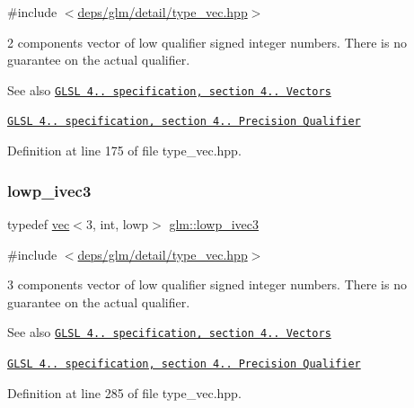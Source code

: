 {\ttfamily \#include $<$\hyperlink{type__vec_8hpp}{deps/glm/detail/type\+\_\+vec.\+hpp}$>$}

2 components vector of low qualifier signed integer numbers. There is no guarantee on the actual qualifier.

\begin{DoxySeeAlso}{See also}
\href{http://www.opengl.org/registry/doc/GLSLangSpec.4.20.8.pdf}{\tt G\+L\+SL 4.. specification, section 4.. Vectors} 

\href{http://www.opengl.org/registry/doc/GLSLangSpec.4.20.8.pdf}{\tt G\+L\+SL 4.. specification, section 4.. Precision Qualifier} 
\end{DoxySeeAlso}


Definition at line 175 of file type\+\_\+vec.\+hpp.

\mbox{\label{group__core__precision_ga77f1494e08fca27e26aebbbfb8162298}} 
\subsubsection{\texorpdfstring{lowp\+\_\+ivec3}{lowp\_ivec3}}
{\footnotesize\ttfamily typedef \hyperlink{structglm_1_1vec}{vec}$<$3, int, lowp$>$ \hyperlink{group__core__precision_ga77f1494e08fca27e26aebbbfb8162298}{glm\+::lowp\+\_\+ivec3}}



{\ttfamily \#include $<$\hyperlink{type__vec_8hpp}{deps/glm/detail/type\+\_\+vec.\+hpp}$>$}

3 components vector of low qualifier signed integer numbers. There is no guarantee on the actual qualifier.

\begin{DoxySeeAlso}{See also}
\href{http://www.opengl.org/registry/doc/GLSLangSpec.4.20.8.pdf}{\tt G\+L\+SL 4.. specification, section 4.. Vectors} 

\href{http://www.opengl.org/registry/doc/GLSLangSpec.4.20.8.pdf}{\tt G\+L\+SL 4.. specification, section 4.. Precision Qualifier} 
\end{DoxySeeAlso}


Definition at line 285 of file type\+\_\+vec.\+hpp.

\mbox{\label{group__core__precision_ga67d57bf0fc189f8153c7c60ad80ec981}} 
